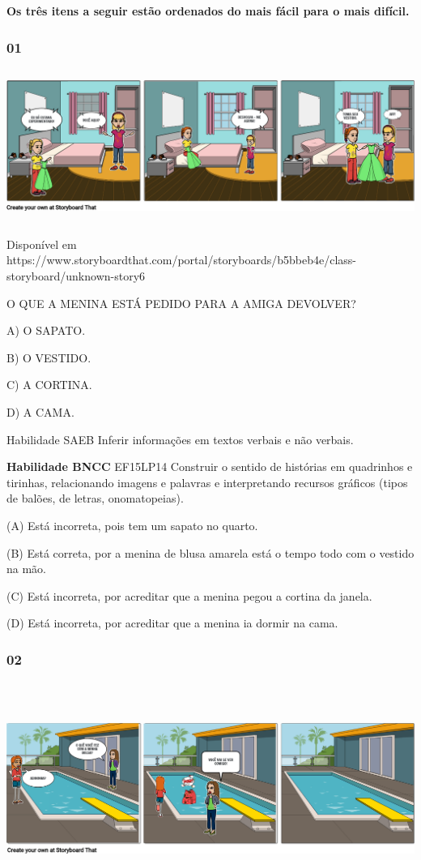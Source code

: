 \begin{escola}
\textbf{Os três itens a seguir estão ordenados do mais fácil para o mais
difícil. }

\subsubsection{01 }\label{section-23}

\includegraphics[width=5.90556in,height=1.95278in]{media/image180.png}

Disponível em
https://www.storyboardthat.com/portal/storyboards/b5bbeb4e/class-storyboard/unknown-story6

O QUE A MENINA ESTÁ PEDIDO PARA A AMIGA DEVOLVER?

A) O SAPATO.

B) O VESTIDO.

C) A CORTINA.

D) A CAMA.

Habilidade SAEB Inferir informações em textos verbais e não verbais.

\textbf{Habilidade BNCC} EF15LP14 Construir o sentido de histórias em
quadrinhos e tirinhas, relacionando imagens e palavras e interpretando
recursos gráficos (tipos de balões, de letras, onomatopeias).

(A) Está incorreta, pois tem um sapato no quarto.

(B) Está correta, por a menina de blusa amarela está o tempo todo com o
vestido na mão.

(C) Está incorreta, por acreditar que a menina pegou a cortina da janela.

(D) Está incorreta, por acreditar que a menina ia dormir na cama.

\subsubsection{02 }\label{section-24}

\includegraphics[width=6.12986in,height=2.72778in]{media/image181.png}


\end{escola}

